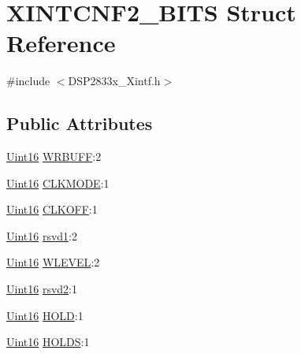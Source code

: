 \hypertarget{struct_x_i_n_t_c_n_f2___b_i_t_s}{}\section{X\+I\+N\+T\+C\+N\+F2\+\_\+\+B\+I\+T\+S Struct Reference}
\label{struct_x_i_n_t_c_n_f2___b_i_t_s}


{\ttfamily \#include $<$D\+S\+P2833x\+\_\+\+Xintf.\+h$>$}

\subsection*{Public Attributes}
\begin{DoxyCompactItemize}
\item 
\hyperlink{_d_s_p2833x___device_8h_a59a9f6be4562c327cbfb4f7e8e18f08b}{Uint16} \hyperlink{struct_x_i_n_t_c_n_f2___b_i_t_s_a6e3c860916adc222c1dce775d180ff92}{W\+R\+B\+U\+F\+F}\+:2
\item 
\hyperlink{_d_s_p2833x___device_8h_a59a9f6be4562c327cbfb4f7e8e18f08b}{Uint16} \hyperlink{struct_x_i_n_t_c_n_f2___b_i_t_s_a0c6e434197ce245ce7c497b70dce32aa}{C\+L\+K\+M\+O\+D\+E}\+:1
\item 
\hyperlink{_d_s_p2833x___device_8h_a59a9f6be4562c327cbfb4f7e8e18f08b}{Uint16} \hyperlink{struct_x_i_n_t_c_n_f2___b_i_t_s_ac1b354196e90bcbdfe7f5a19b088bb84}{C\+L\+K\+O\+F\+F}\+:1
\item 
\hyperlink{_d_s_p2833x___device_8h_a59a9f6be4562c327cbfb4f7e8e18f08b}{Uint16} \hyperlink{struct_x_i_n_t_c_n_f2___b_i_t_s_a8eec181a28847d8d7157b9c1bcb54ef7}{rsvd1}\+:2
\item 
\hyperlink{_d_s_p2833x___device_8h_a59a9f6be4562c327cbfb4f7e8e18f08b}{Uint16} \hyperlink{struct_x_i_n_t_c_n_f2___b_i_t_s_a187a4c73e241198c6a391dda32e99975}{W\+L\+E\+V\+E\+L}\+:2
\item 
\hyperlink{_d_s_p2833x___device_8h_a59a9f6be4562c327cbfb4f7e8e18f08b}{Uint16} \hyperlink{struct_x_i_n_t_c_n_f2___b_i_t_s_aa9bb65537cc2371c45e6b45b4d5ca20d}{rsvd2}\+:1
\item 
\hyperlink{_d_s_p2833x___device_8h_a59a9f6be4562c327cbfb4f7e8e18f08b}{Uint16} \hyperlink{struct_x_i_n_t_c_n_f2___b_i_t_s_a044d022f640c250585c505e91cd90d0c}{H\+O\+L\+D}\+:1
\item 
\hyperlink{_d_s_p2833x___device_8h_a59a9f6be4562c327cbfb4f7e8e18f08b}{Uint16} \hyperlink{struct_x_i_n_t_c_n_f2___b_i_t_s_a703e68fa6f36db2e4a12b2d5380ee4c3}{H\+O\+L\+D\+S}\+:1
\item 

\end{DoxyCompactItemize}
